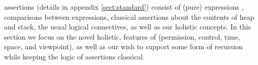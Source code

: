 

\Chainmail assertions (details in appendix \ref{sect:standard}) consist of (pure) expressions \e, comparisons between expressions, classical
assertions about the contents of heap and stack, the usual logical
connectives, as well as our holistic concepts.
In this section we focus on the novel
 holistic, features of \Chainmail (permission, control, time, space, and viewpoint),
as well as our wish to support some form of recursion while keeping the logic of assertions classical.

 




